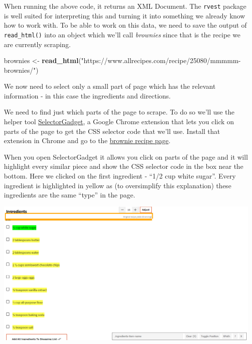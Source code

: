 \documentclass[
  12pt,
]{book}
\newenvironment{Shaded}{\begin{snugshade}}{\end{snugshade}}
\newcommand{\KeywordTok}[1]{\textcolor[rgb]{0.27,0.27,0.27}{\textbf{#1}}}
\newcommand{\NormalTok}[1]{#1}
\newcommand{\StringTok}[1]{\textcolor[rgb]{0.5,0.5,0.5}{#1}}
\begin{document}
When running the above code, it returns an XML Document. The \texttt{rvest} package is well suited for interpreting this and turning it into something we already know how to work with. To be able to work on this data, we need to save the output of \texttt{read\_html()} into an object which we'll call \emph{brownies} since that is the recipe we are currently scraping.

\begin{Shaded}
\begin{Highlighting}[]
\NormalTok{brownies \textless{}{-}}\StringTok{ }\KeywordTok{read\_html}\NormalTok{(}\StringTok{"https://www.allrecipes.com/recipe/25080/mmmmm{-}brownies/"}\NormalTok{)}
\end{Highlighting}
\end{Shaded}

We now need to select only a small part of page which has the relevant information - in this case the ingredients and directions.

We need to find just which parts of the page to scrape. To do so we'll use the helper tool \href{https://selectorgadget.com/}{SelectorGadget}, a Google Chrome extension that lets you click on parts of the page to get the CSS selector code that we'll use. Install that extension in Chrome and go to the \href{https://www.allrecipes.com/recipe/25080/mmmmm-brownies/?internalSource=hub\%20recipe\&referringContentType=Search}{brownie recipe page}.

When you open SelectorGadget it allows you click on parts of the page and it will highlight every similar piece and show the CSS selector code in the box near the bottom. Here we clicked on the first ingredient - ``1/2 cup white sugar''. Every ingredient is highlighted in yellow as (to oversimplify this explanation) these ingredients are the same ``type'' in the page.

\includegraphics{images/brownies_3.PNG}
\end{document}
